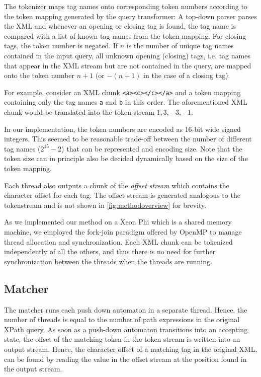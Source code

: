 The tokenizer maps tag names onto corresponding token numbers according to the
token mapping generated by the query transformer: A top-down parser parses the
XML and whenever an opening or closing tag is found, the tag name is compared
with a list of known tag names from the token mapping. For closing tags, the
token number is negated. If $n$ is the number of unique tag names contained in
the input query, all unknown opening (closing) tags, i.e. tag names that appear
in the XML stream but are not contained in the query, are mapped onto the token
number $n+1$ (or $-(n+1)$ in the case of a closing tag).

For example, consider an XML chunk \verb;<a><c></c></a>; and a token mapping
containing only the tag names \verb;a; and \verb;b; in this order. The
aforementioned XML chunk would be translated into the token stream $1, 3, -3,
-1$.

In our implementation, the token numbers are encoded as 16-bit wide signed
integers. This seemed to be reasonable trade-off between the number of different
tag names ($2^{15}-2$) that can be represented and encoding size. Note that the
token size can in principle also be decided dynamically based on the size of the
token mapping.

Each thread also outputs a chunk of the \emph{offset stream} which contains the
character offset for each tag. The offset stream is generated analogous to the
tokenstream and is not shown in \ref{fig:methodoverview} for brevity.

As we implemented our method on a Xeon Phi which is a shared
memory machine, we employed the fork-join paradigm offered by OpenMP to manage
thread allocation and synchronization. Each XML chunk can be tokenized
independently of all the others, and thus there is no need for further
synchronization between the threads when the threads are running.

\subsection{Matcher}

The matcher runs each push down automaton in a separate thread. Hence, the
number of threads is equal to the number of path expressions in the original
XPath query. As soon as a push-down automaton transitions into an accepting
state, the offset of the matching token in the token stream is written into an
output stream. Hence, the character offset of a matching tag in the original
XML, can be found by reading the value in the offset stream at the position
found in the output stream.

